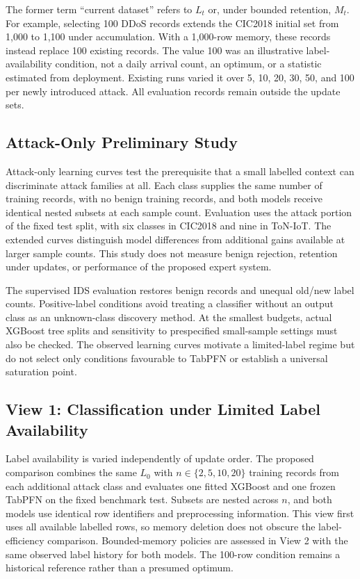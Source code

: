 \documentclass[sigconf,anonymous,pbalance]{acmart}
\begin{document}
The former term ``current dataset'' refers to $L_t$ or, under bounded retention, $M_t$. For example, selecting 100 DDoS records extends the CIC2018 initial set from 1,000 to 1,100 under accumulation. With a 1,000-row memory, these records instead replace 100 existing records. The value 100 was an illustrative label-availability condition, not a daily arrival count, an optimum, or a statistic estimated from deployment. Existing runs varied it over 5, 10, 20, 30, 50, and 100 per newly introduced attack. All evaluation records remain outside the update sets.

\subsection{Attack-Only Preliminary Study}
\label{sec:fewshot}
Attack-only learning curves test the prerequisite that a small labelled context can discriminate attack families at all. Each class supplies the same number of training records, with no benign training records, and both models receive identical nested subsets at each sample count. Evaluation uses the attack portion of the fixed test split, with six classes in CIC2018 and nine in ToN-IoT. The extended curves distinguish model differences from additional gains available at larger sample counts. This study does not measure benign rejection, retention under updates, or performance of the proposed expert system.

The supervised IDS evaluation restores benign records and unequal old/new label counts. Positive-label conditions avoid treating a classifier without an output class as an unknown-class discovery method. At the smallest budgets, actual XGBoost tree splits and sensitivity to prespecified small-sample settings must also be checked. The observed learning curves motivate a limited-label regime but do not select only conditions favourable to TabPFN or establish a universal saturation point.

\subsection{View 1: Classification under Limited Label Availability}
\label{sec:availability}
Label availability is varied independently of update order. The proposed comparison combines the same $L_0$ with $n\in\{2,5,10,20\}$ training records from each additional attack class and evaluates one fitted XGBoost and one frozen TabPFN on the fixed benchmark test. Subsets are nested across $n$, and both models use identical row identifiers and preprocessing information. This view first uses all available labelled rows, so memory deletion does not obscure the label-efficiency comparison. Bounded-memory policies are assessed in View 2 with the same observed label history for both models. The 100-row condition remains a historical reference rather than a presumed optimum.
\end{document}
